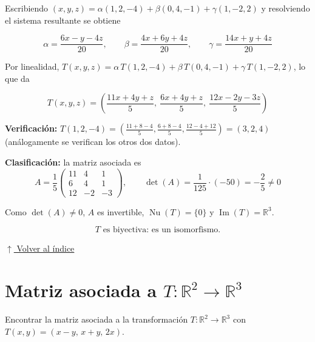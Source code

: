\documentclass[12pt]{article}
\newcommand{\volverindice}{%
    \vspace{1em}%
    \begin{flushright}%
        \hyperlink{indice}{\small $\uparrow$ Volver al índice}%
    \end{flushright}%
}
\begin{document}
\begin{enumerate}[label=\alph*.-]
    Escribiendo $(x,y,z)=\alpha(1,2,-4)+\beta(0,4,-1)+\gamma(1,-2,2)$ y
    resolviendo el sistema resultante se obtiene

    \[
    \alpha=\frac{6x-y-4z}{20},\qquad
    \beta=\frac{4x+6y+4z}{20},\qquad
    \gamma=\frac{14x+y+4z}{20}
    \]

    Por linealidad, $T(x,y,z)=\alpha\,T(1,2,-4)+\beta\,T(0,4,-1)+\gamma\,T(1,-2,2)$,
    lo que da

    \[
    \boxed{
    T(x,y,z)=\left(\frac{11x+4y+z}{5},\ \frac{6x+4y+z}{5},\ \frac{12x-2y-3z}{5}\right)
    }
    \]

    \textbf{Verificación:} $T(1,2,-4)=\left(\frac{11+8-4}{5},\frac{6+8-4}{5},\frac{12-4+12}{5}\right)=(3,2,4)$ \checkmark
    (análogamente se verifican los otros dos datos).

    \textbf{Clasificación:} la matriz asociada es
    \[
    A=\frac15\begin{pmatrix}11&4&1\\6&4&1\\12&-2&-3\end{pmatrix},
    \qquad \det(A)=\frac{1}{125}\cdot(-50)=-\frac{2}{5}\neq0
    \]

    Como $\det(A)\neq0$, $A$ es invertible, $\operatorname{Nu}(T)=\{0\}$
    y $\operatorname{Im}(T)=\mathbb{R}^3$.

    \[
    \boxed{T \text{ es biyectiva: es un isomorfismo.}}
    \]

\end{enumerate}

\volverindice
\newpage


\section{Matriz asociada a \texorpdfstring{$T:\mathbb{R}^2\to\mathbb{R}^3$}{T}}

Encontrar la matriz asociada a la transformación
$T:\mathbb{R}^2\to\mathbb{R}^3$ con $T(x,y)=(x-y,\,x+y,\,2x)$.
\end{document}
